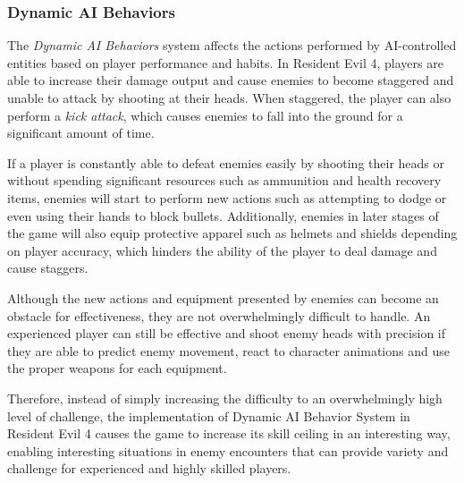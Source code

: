 \subsubsection{Dynamic AI Behaviors}


The \emph{Dynamic AI Behaviors} system affects the actions performed by AI-controlled entities based on player performance and habits. In Resident Evil 4, players are able to increase their damage output and cause enemies to become staggered and unable to attack by shooting at their heads. When staggered, the player can also perform a \emph{kick attack}, which causes enemies to fall into the ground for a significant amount of time. 

If a player is constantly able to defeat enemies easily by shooting their heads or without spending significant resources such as ammunition and health recovery items, enemies will start to perform new actions such as attempting to dodge or even using their hands to block bullets. Additionally, enemies in later stages of the game will also equip protective apparel such as helmets and shields depending on player accuracy, which hinders the ability of the player to deal damage and cause staggers.

Although the new actions and equipment presented by enemies can become an obstacle for effectiveness, they are not overwhelmingly difficult to handle. An experienced player can still be effective and shoot enemy heads with precision if they are able to predict enemy movement, react to character animations and use the proper weapons for each equipment.





Therefore, instead of simply increasing the difficulty to an overwhelmingly high level of challenge, the implementation of Dynamic AI Behavior System in Resident Evil 4 causes the game to increase its skill ceiling in an interesting way, enabling interesting situations in enemy encounters that can provide variety and challenge for experienced and highly skilled players.

